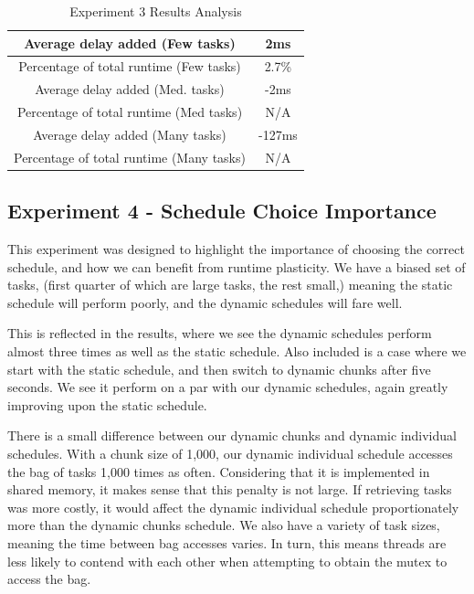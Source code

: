 \begin{table}[H]
\centering
	\begin{tabular}{|c|c|}
		\hline
		Average delay added (Few tasks) & 2ms \\
		\hline
		Percentage of total runtime (Few tasks) & 2.7\% \\
		\hline
		\hline
		Average delay added (Med. tasks) & -2ms \\
		\hline
		Percentage of total runtime (Med tasks) & N/A \\
		\hline
		\hline
		Average delay added (Many tasks) & -127ms \\
		\hline
		Percentage of total runtime (Many tasks) & N/A \\
		\hline
	\end{tabular}
	\caption{Experiment 3 Results Analysis}
	\label{table:results_experiment_3_results_analysis}
\end{table}





\subsection{Experiment 4 - Schedule Choice Importance}

This experiment was designed to highlight the importance of choosing the correct schedule, and how we can benefit from runtime plasticity. We have a biased set of tasks, (first quarter of which are large tasks, the rest small,) meaning the static schedule will perform poorly, and the dynamic schedules will fare well.

This is reflected in the results, where we see the dynamic schedules perform almost three times as well as the static schedule. Also included is a case where we start with the static schedule, and then switch to dynamic chunks after five seconds. We see it perform on a par with our dynamic schedules, again greatly improving upon the static schedule.

There is a small difference between our dynamic chunks and dynamic individual schedules. With a chunk size of 1,000, our dynamic individual schedule accesses the bag of tasks 1,000 times as often. Considering that it is implemented in shared memory, it makes sense that this penalty is not large. If retrieving tasks was more costly, it would affect the dynamic individual schedule proportionately more than the dynamic chunks schedule. We also have a variety of task sizes, meaning the time between bag accesses varies. In turn, this means threads are less likely to contend with each other when attempting to obtain the mutex to access the bag.

